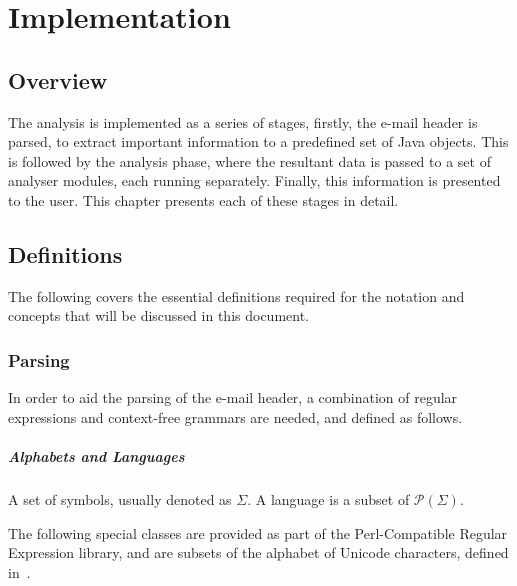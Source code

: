 \chapter{Implementation}\label{chap:imp}
\section{Overview}

The  analysis is implemented as a series of stages, firstly, the e-mail header
is parsed, to extract important information to a predefined set of Java objects.
This is followed by the analysis phase, where the resultant data is passed to a
set of analyser modules, each running separately.  Finally, this information is
presented to the user.  This chapter presents each of these stages in detail.

\section{Definitions}

The following covers the essential definitions required for the notation and
concepts that will be discussed in this document.

\subsection{Parsing}

In order to aid the parsing of the e-mail header, a combination of regular
expressions and context-free grammars are needed, and defined as follows.

\paragraph{Alphabets and Languages}

A set of symbols, usually denoted as $\Sigma$.  A language is a subset of
$\mathcal P (\Sigma)$.

The following special classes are provided as part of the Perl-Compatible
Regular Expression library, and are subsets of the alphabet of Unicode
characters, defined in~\cite{php_group_gutmans_lerdorf_suraski_boerger}.

